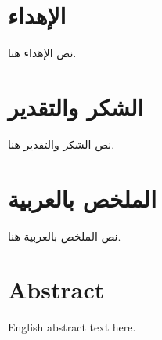 \documentclass[a4paper,12pt]{book}
\begin{document}
	

	
	\begin{otherlanguage}{arabic}
	\chapter*{الإهداء}
	نص الإهداء هنا.

	\chapter*{الشكر والتقدير}
	نص الشكر والتقدير هنا.

	\chapter*{الملخص بالعربية}
	نص الملخص بالعربية هنا.
\end{otherlanguage}


	\chapter*{Abstract}
	\begin{otherlanguage}{arabic}
\end{otherlanguage}
	English abstract text here.

\newpage
\begin{otherlanguage}{arabic}
	\renewcommand{\contentsname}{المحتويات} %
	
	\tableofcontents
	
\end{otherlanguage}
\end{document}
